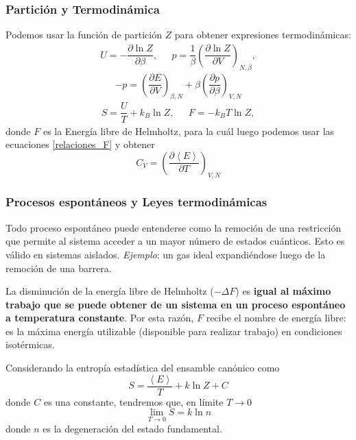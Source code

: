 \documentclass[]{article}
\numberwithin{equation}{section}
\newcommand{\deriv}[3]{\left(\frac{\partial #1}{\partial #2} \right)_{#3}}
\newcommand{\dderiv}[3]{\left(\dfrac{\partial #1}{\partial #2} \right)_{#3}}
\newcommand{\0}{\textcolor{gray}{0}}
\newcommand{\pd}[2]{\dfrac{\partial #1}{\partial #2}}
\begin{document}
\subsubsection{Partición y Termodinámica}
Podemos usar la función de partición \(Z\) para obtener expresiones termodinámicas:
\begin{equation}
	\begin{matrix}
		U = - \pd{\ln Z}{\beta}, &~~~ p =\dfrac{1}{\beta}\dderiv{\ln Z}{V}{N,\beta},
	\end{matrix}
\end{equation}
\begin{equation}
	-p = \dderiv{E}{V}{\beta,N} + \beta\dderiv{p}{\beta}{V,N}
\end{equation}
\begin{equation}
	\begin{matrix}
		S = \dfrac{U}{T} + k_B \ln Z, &~~~ F = -k_B T \ln Z,
	\end{matrix}
\end{equation}
donde \(F\) es la Energía libre de Helmholtz, para la cuál luego podemos usar las ecuaciones \ref{relaciones_F} y obtener
\begin{equation}
	C_V = \deriv{\left\langle E\right\rangle}{T}{V,N}
\end{equation}
\subsubsection{Procesos espontáneos y Leyes termodinámicas}
Todo proceso espontáneo puede entenderse como la remoción de una restricción que permite al sistema acceder a un mayor número de estados cuánticos. Esto es válido en sistemas aislados. \textit{Ejemplo}: un gas ideal expandiéndose luego de la remoción de una barrera.

La disminución de la energía libre de Helmholtz (\(-\Delta F\)) es \textbf{igual al máximo trabajo que se puede obtener de un sistema en un proceso espontáneo a temperatura constante}. Por esta razón, \(F\) recibe el nombre de energía libre: es la máxima energía utilizable (disponible para realizar trabajo) en condiciones isotérmicas.


Considerando la entropía estadística del ensamble canónico como
\begin{equation}
	S = \frac{\left< E \right>}{T} + k \ln Z + C
\end{equation}
donde \(C\) es una constante, tendremos que, en límite \(T\rightarrow 0\)
\begin{equation}
	\lim_{T\rightarrow 0} S = k \ln n
\end{equation}
donde \(n\) es la degeneración del estado fundamental.
\end{document}
